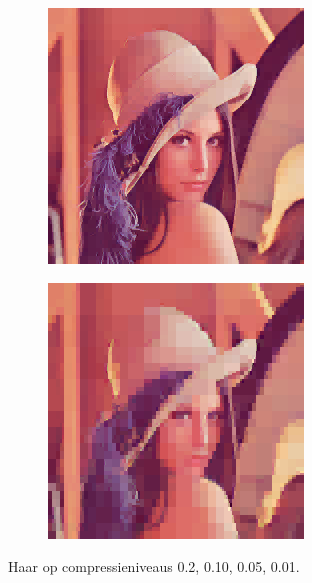 \documentclass[11pt]{report}
\theoremstyle{plain}
\theoremstyle{remark}
\begin{document}
\begin{figure}
\begin{subfigure}[b]{0.24\textwidth}
	\end{subfigure}
	\begin{subfigure}[b]{0.24\textwidth}
		\centering
		\includegraphics[width=\textwidth]{plaatjes/Lenna_haar_0_05.png}
	\end{subfigure}
	\begin{subfigure}[b]{0.24\textwidth}
		\centering
		\includegraphics[width=\textwidth]{plaatjes/Lenna_haar_0_01.png}
	\end{subfigure}	
	\caption{Haar op compressieniveaus 0.2, 0.10, 0.05, 0.01.}
\end{figure}
\end{document}
